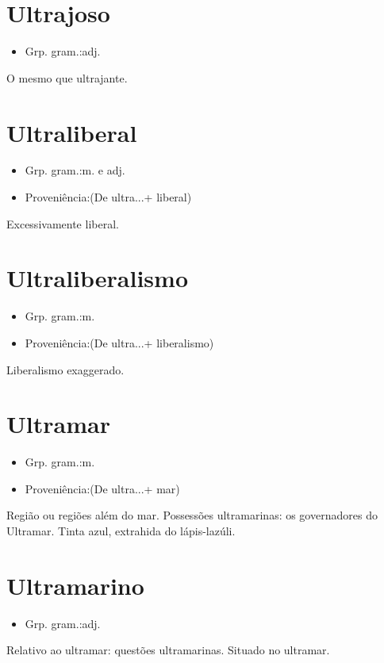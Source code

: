 \documentclass{article}
\begin{document}
\section{Ultrajoso}
\begin{itemize}
\item {Grp. gram.:adj.}
\end{itemize}
O mesmo que \textunderscore ultrajante\textunderscore .
\section{Ultraliberal}
\begin{itemize}
\item {Grp. gram.:m.  e  adj.}
\end{itemize}
\begin{itemize}
\item {Proveniência:(De \textunderscore ultra...\textunderscore  + \textunderscore liberal\textunderscore )}
\end{itemize}
Excessivamente liberal.
\section{Ultraliberalismo}
\begin{itemize}
\item {Grp. gram.:m.}
\end{itemize}
\begin{itemize}
\item {Proveniência:(De \textunderscore ultra...\textunderscore  + \textunderscore liberalismo\textunderscore )}
\end{itemize}
Liberalismo exaggerado.
\section{Ultramar}
\begin{itemize}
\item {Grp. gram.:m.}
\end{itemize}
\begin{itemize}
\item {Proveniência:(De \textunderscore ultra...\textunderscore  + \textunderscore mar\textunderscore )}
\end{itemize}
Região ou regiões além do mar.
Possessões ultramarinas: \textunderscore os governadores do Ultramar\textunderscore .
Tinta azul, extrahida do lápis-lazúli.
\section{Ultramarino}
\begin{itemize}
\item {Grp. gram.:adj.}
\end{itemize}
Relativo ao ultramar: \textunderscore questões ultramarinas\textunderscore .
Situado no ultramar.
\end{document}

